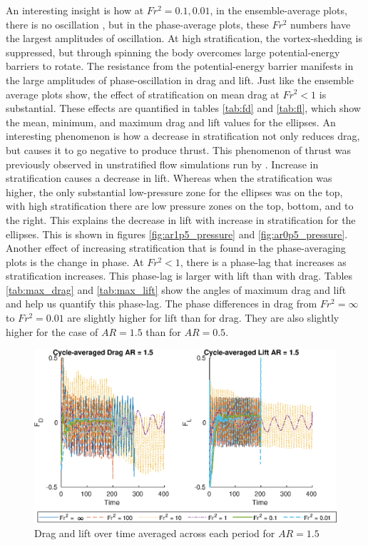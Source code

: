 An interesting insight is how at $Fr^2 = 0.1, 0.01$, in the ensemble-average plots, there is no oscillation , but in the phase-average plots, these $Fr^2$ numbers have the largest amplitudes of oscillation. At high stratification, the vortex-shedding is suppressed, but through spinning the body overcomes large potential-energy barriers to rotate. The resistance from the potential-energy barrier manifests in the large amplitudes of phase-oscillation in drag and lift. Just like the ensemble average plots show, the effect of stratification on mean drag at $Fr^2 < 1$ is substantial. These effects are quantified in tables \ref{tab:fd} and \ref{tab:fl}, which show the mean, minimum, and maximum drag and lift values for the ellipses. An interesting phenomenon is how a decrease in stratification not only reduces drag, but causes it to go negative to produce thrust.  This phenomenon of thrust was previously observed in unstratified flow simulations run by \cite{lua_rotating_2018}.  Increase in stratification causes a decrease in lift. Whereas when the stratification was higher, the only substantial low-pressure zone for the ellipses was on the top, with high stratification there are low pressure zones on the top, bottom, and to the right. This explains the decrease in lift with increase in stratification for the ellipses. This is shown in figures \ref{fig:ar1p5_pressure} and \ref{fig:ar0p5_pressure}.\\
Another effect of increasing stratification that is found in the phase-averaging plots is the change in phase. At $Fr^2 < 1$, there is a phase-lag that increases as stratification increases. This phase-lag is larger with lift than with drag. Tables \ref{tab:max_drag} and \ref{tab:max_lift} show the angles of maximum drag and lift and help us quantify this phase-lag. The phase differences in drag from $Fr^2 = \infty$ to $Fr^2 = 0.01$ are slightly higher for lift than for drag. They are also slightly higher for the case of $AR = 1.5$ than for $AR = 0.5$. 
 
\begin{figure}
    \centerline{\includegraphics[width=\textwidth]{images/spinning_ellipse/mvmean1p5.eps}}
    \caption{Drag and lift over time averaged across each period for $AR = 1.5$}
    \label{fig:mvmean1p5}
\end{figure}

